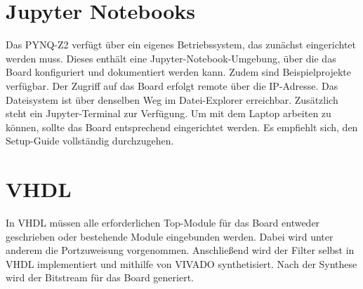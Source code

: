 \documentclass[
  ngerman,
  letterpaper,
  DIV=11]{scrreprt}
\begin{document}
\section{Jupyter Notebooks}\label{jupyter-notebooks}

Das PYNQ-Z2 verfügt über ein eigenes Betriebssystem, das zunächst
eingerichtet werden muss. Dieses enthält eine Jupyter-Notebook-Umgebung,
über die das Board konfiguriert und dokumentiert werden kann. Zudem sind
Beispielprojekte verfügbar. Der Zugriff auf das Board erfolgt remote
über die IP-Adresse. Das Dateisystem ist über denselben Weg im
Datei-Explorer erreichbar. Zusätzlich steht ein Jupyter-Terminal zur
Verfügung. Um mit dem Laptop arbeiten zu können, sollte das Board
entsprechend eingerichtet werden. Es empfiehlt sich, den Setup-Guide
vollständig durchzugehen.

\section{VHDL}\label{vhdl}

In VHDL müssen alle erforderlichen Top-Module für das Board entweder
geschrieben oder bestehende Module eingebunden werden. Dabei wird unter
anderem die Portzuweisung vorgenommen. Anschließend wird der Filter
selbst in VHDL implementiert und mithilfe von VIVADO synthetisiert. Nach
der Synthese wird der Bitstream für das Board generiert.
\end{document}
